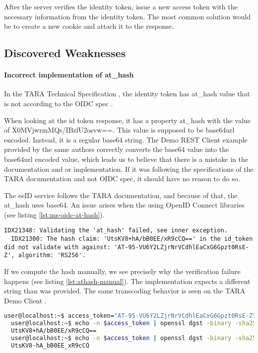 After the server verifies the identity token, issue a new access token with the necessary information from the identity token. The most common solution would be to create a new cookie and attach it to the response.

\subsection{Discovered Weaknesses}

\paragraph{Incorrect implementation of at\_hash}

In the TARA Technical Specification \cite{tara-technical}, the identity token has at\_hash value that is not according to the OIDC spec \cite{oidc}.

When looking at the id token response, it has a property at\_hash with the value of {X0MVjwrmMQs/IBzfU2osvw==}. This value is supposed to be base64url encoded. Instead, it is a regular base64 string. The Demo REST Client example provided by the same authors \cite{tara-demorest} correctly converts the base64 value into the base64url encoded value, which leads us to believe that there is a mistake in the documentation and or implementation. If it was following the specifications of the TARA documentation and not OIDC spec, it should have no reason to do so.

The eeID service follows the TARA documentation, and because of that, the at\_hash uses base64. An issue arises when the using OpenID Connect libraries (see listing \ref{lst:ms-oidc-at-hash}).

\begin{lstlisting}[caption={Microsoft.IdentityModel.Protocols.OpenIdConnect fails to validate at\_hash}, label={lst:ms-oidc-at-hash}]
  IDX21348: Validating the 'at_hash' failed, see inner exception.
  IDX21300: The hash claim: 'UtsKV8+hA/bB0EE/xR9cCQ==' in the id_token did not validate with against: 'AT-95-VU6Y2LZjrNrVCdhlEaCxG6Gpzt0RsE-Z', algorithm: 'RS256'.
\end{lstlisting}

If we compute the hash manually, we see precisely why the verification failure happens (see listing \ref{lst:athash-manual}). The implementation expects a different string than was provided. The same transcoding behavior is seen on the TARA Demo Client \cite{tara-demorest}.

\begin{lstlisting}[caption={Verifying at\_hash manually}, label={lst:athash-manual}, language={bash}]
  user@localhost:~$ access_token="AT-95-VU6Y2LZjrNrVCdhlEaCxG6Gpzt0RsE-Z"
  user@localhost:~$ echo -n $access_token | openssl dgst -binary -sha256 | head -c 16 | base64
  UtsKV8+hA/bB0EE/xR9cCQ==
  user@localhost:~$ echo -n $access_token | openssl dgst -binary -sha256 | head -c 16 | base64 | tr '/+' '_-' | tr -d '='
  UtsKV8-hA_bB0EE_xR9cCQ
\end{lstlisting}

